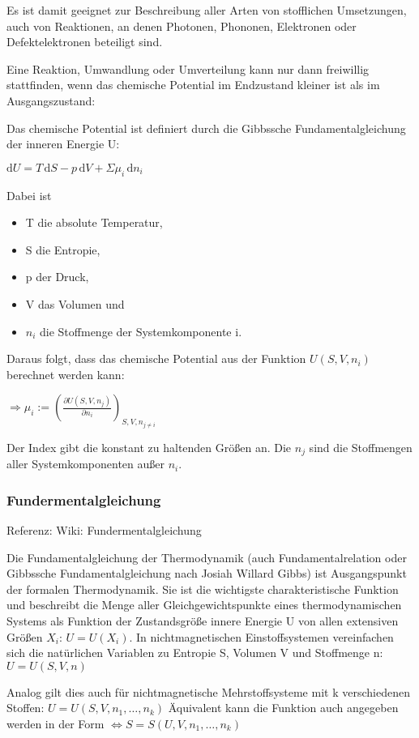 \documentclass[]{article}
\begin{document}
	Es ist damit geeignet zur Beschreibung aller Arten von stofflichen Umsetzungen, auch von Reaktionen, an denen Photonen, Phononen, Elektronen oder Defektelektronen beteiligt sind.
	
	Eine Reaktion, Umwandlung oder Umverteilung kann nur dann freiwillig stattfinden, wenn das chemische Potential im Endzustand kleiner ist als im Ausgangszustand:
	
	Das chemische Potential ist definiert durch die Gibbssche Fundamentalgleichung der inneren Energie U:
	
	$ \mathrm{d}U = T\, \mathrm{d}S - p\, \mathrm {d}V + \Sigma\mu_i\, \mathrm{d}n_i \!\quad$
	
	Dabei ist
	\begin{itemize}
		\item T die absolute Temperatur,
		\item S die Entropie,
		\item p der Druck,
		\item V das Volumen und
		\item $n_i$ die Stoffmenge der Systemkomponente i.
	\end{itemize}
	Daraus folgt, dass das chemische Potential aus der Funktion $U(S, V, n_i)$ berechnet werden kann:
	
	$ \Rightarrow \mu_i := \left( \frac{\partial U(S,V,n_j)}{\partial {n_i}} \right)_{S,V,n_{j\ne i}}$
	
	Der Index gibt die konstant zu haltenden Größen an. Die $n_j$ sind die Stoffmengen aller Systemkomponenten außer $n_i$.

\subsubsection{Fundermentalgleichung}
Referenz: Wiki: Fundermentalgleichung

Die Fundamentalgleichung der Thermodynamik (auch Fundamentalrelation oder Gibbssche Fundamentalgleichung nach Josiah Willard Gibbs) ist Ausgangspunkt der formalen Thermodynamik. Sie ist die wichtigste charakteristische Funktion und beschreibt die Menge aller Gleichgewichtspunkte eines thermodynamischen Systems als Funktion der Zustandsgröße innere Energie U von allen extensiven Größen $X_i$: $ U = U(X_i)$. In nichtmagnetischen Einstoffsystemen vereinfachen sich die natürlichen Variablen zu Entropie S, Volumen V und Stoffmenge n:$U = U(S,V,n)$

Analog gilt dies auch für nichtmagnetische Mehrstoffsysteme mit k verschiedenen Stoffen: $U = U(S, V, n_1, \dots, n_k)$ Äquivalent kann die Funktion auch angegeben werden in der Form $\Leftrightarrow S = S(U, V, n_1, \dots, n_k)$
\end{document}
